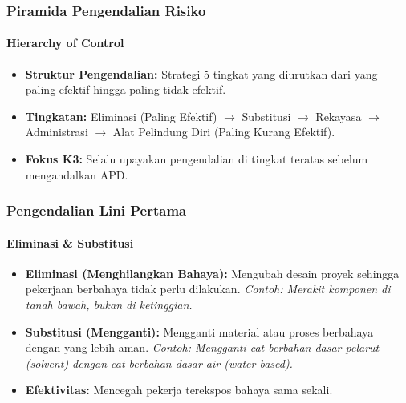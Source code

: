 \documentclass[../main.tex]{subfiles}
\begin{document}
\begin{frame}[mytitle=center, c, mycolor=digiPH_leaf, dark]
	\frametitle{Piramida Pengendalian Risiko}
	\framesubtitle{Hierarchy of Control}

	\begin{itemize}
		\item \textbf{Struktur Pengendalian:} Strategi 5 tingkat yang diurutkan dari yang paling efektif hingga paling tidak efektif.
		\item \textbf{Tingkatan:} Eliminasi (Paling Efektif) $\rightarrow$ Substitusi $\rightarrow$ Rekayasa $\rightarrow$ Administrasi $\rightarrow$ Alat Pelindung Diri (Paling Kurang Efektif).
		\item \textbf{Fokus K3:} Selalu upayakan pengendalian di tingkat teratas sebelum mengandalkan APD.
	\end{itemize}

	\vfill
\end{frame}

\begin{frame}[mytitle=imageplus, t]
	\frametitle{Pengendalian Lini Pertama}
	\framesubtitle{Eliminasi \& Substitusi}

	\begin{itemize}
		\item \textbf{Eliminasi (Menghilangkan Bahaya):} Mengubah desain proyek sehingga pekerjaan berbahaya tidak perlu dilakukan. \textit{Contoh: Merakit komponen di tanah bawah, bukan di ketinggian.}
		\item \textbf{Substitusi (Mengganti):} Mengganti material atau proses berbahaya dengan yang lebih aman. \textit{Contoh: Mengganti cat berbahan dasar pelarut (solvent) dengan cat berbahan dasar air (water-based).}
		\item \textbf{Efektivitas:} Mencegah pekerja terekspos bahaya sama sekali.
	\end{itemize}

	\vfill
\end{frame}
\end{document}
